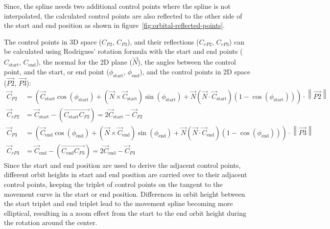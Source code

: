 Since, the spline needs two additional control points where the spline is not interpolated, the calculated control
points are also reflected to the other side of the start and end position as shown in
figure~\ref{fig:orbital-reflected-points}.

The control points in 3D space ($C_{P2}$, $C_{P3}$), and their reflections ($C_{rP2}$, $C_{rP3}$) can be calculated
using Rodrigues' rotation formula with the start and end points ($C_{\mathrm{start}}$, $C_{\mathrm{end}}$), the
normal for the 2D plane ($\vec{N}$), the angles between the control point, and the start, or end point
($\phi_{\mathrm{start}}$, $\phi_{\mathrm{end}}$), and the control points in 2D space ($\overrightarrow{P2}$,
$\overrightarrow{P3}$):
\begin{equation}
    \label{eq:control-point-transformation}
    \begin{aligned}
        \vec{C}_{P2} &= \left(
            \vec{C}_{\mathrm{start}} \cos(\phi_{\mathrm{start}}) +
            ( \vec{N} \times \vec{C}_{\mathrm{start}} )\sin(\phi_{\mathrm{start}}) +
            \vec{N} ( \vec{N} \cdot \vec{C}_{\mathrm{start}} )( 1 - \cos(\phi_{\mathrm{start}}) )
        \right) \cdot \left\| \overrightarrow{P2} \right\|
        \\
        \vec{C}_{rP2} &= \vec{C}_{\mathrm{start}} - \left( \overrightarrow{C_{\mathrm{start}}C_{P2}} \right) =
        2\vec{C}_{\mathrm{start}} - \vec{C}_{P2}
        \\
        \vec{C}_{P3} &= \left(
            \vec{C}_{\mathrm{end}} \cos(\phi_{\mathrm{end}}) +
            ( \vec{N} \times \vec{C}_{\mathrm{end}} )\sin(\phi_{\mathrm{end}}) +
            \vec{N} ( \vec{N} \cdot \vec{C}_{\mathrm{end}} )( 1 - \cos(\phi_{\mathrm{end}}) )
        \right) \cdot \left\| \overrightarrow{P3} \right\|
        \\
        \vec{C}_{rP3} &= \vec{C}_{\mathrm{end}} - \left( \overrightarrow{C_{\mathrm{end}}C_{P3}} \right) =
        2\vec{C}_{\mathrm{end}} - \vec{C}_{P3}
    \end{aligned}
\end{equation}
Since the start and end position are used to derive the adjacent control points, different orbit heights in start and
end position are carried over to their adjacent control points, keeping the triplet of control points on the tangent
to the movement curve in the start or end position.
Differences in orbit height between the start triplet and end triplet lead to the movement spline becoming more
elliptical, resulting in a zoom effect from the start to the end orbit height during the rotation around the center.

